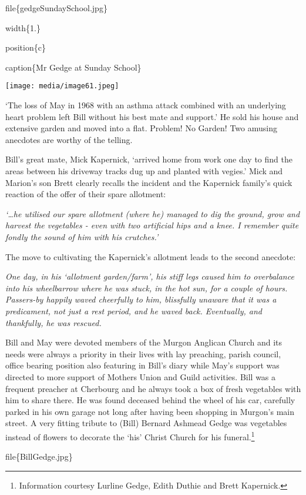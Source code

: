 file\{gedgeSundaySchool.jpg\}

width\{1.\}

position\{c\}

caption\{Mr Gedge at Sunday School\}

\texttt{[image: media/image61.jpeg]}

`The loss of May in 1968 with an asthma attack combined with an underlying heart problem left Bill without his best mate and support.' He sold his house and extensive garden and moved into a flat. Problem! No Garden! Two amusing anecdotes are worthy of the telling.

Bill's great mate, Mick Kapernick, `arrived home from work one day to find the areas between his driveway tracks dug up and planted with vegies.' Mick and Marion's son Brett clearly recalls the incident and the Kapernick family's quick reaction of the offer of their spare allotment:

\emph{`\ldots he utilised our spare allotment (where he) managed to dig the ground, grow and harvest the vegetables - even with two artificial hips and a knee. I remember quite fondly the sound of him with his crutches.'}

The move to cultivating the Kapernick's allotment leads to the second anecdote:

\emph{One day, in his `allotment garden/farm', his stiff legs caused him to overbalance into his wheelbarrow where he was stuck, in the hot sun, for a couple of hours. Passers-by happily waved cheerfully to him, blissfully unaware that it was a predicament, not just a rest period, and he waved back. Eventually, and thankfully, he was rescued.}

Bill and May were devoted members of the Murgon Anglican Church and its needs were always a priority in their lives with lay preaching, parish council, office bearing position also featuring in Bill's diary while May's support was directed to more support of Mothers Union and Guild activities. Bill was a frequent preacher at Cherbourg and he always took a box of fresh vegetables with him to share there. He was found deceased behind the wheel of his car, carefully parked in his own garage not long after having been shopping in Murgon's main street. A very fitting tribute to (Bill) Bernard Ashmead Gedge was vegetables instead of flowers to decorate the `his' Christ Church for his funeral.\footnote{Information courtesy Lurline Gedge, Edith Duthie and Brett Kapernick.}

file\{BillGedge.jpg\}

